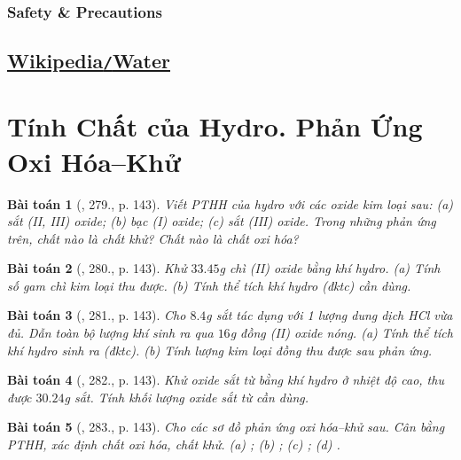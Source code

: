 \documentclass{article}
\newtheorem{baitoan}{Bài toán}
\begin{document}
\subsubsection{Safety \& Precautions}


\subsection{\href{https://en.wikipedia.org/wiki/Water}{Wikipedia\texttt{/}Water}}


\section{Tính Chất của Hydro. Phản Ứng Oxi Hóa--Khử}

\begin{baitoan}[\cite{An_400_BT_Hoa_Hoc_8_2020}, 279., p. 143]
	Viết PTHH của hydro với các oxide kim loại sau: (a) sắt (II, III) oxide; (b) bạc (I) oxide; (c) sắt (III) oxide. Trong những phản ứng trên, chất nào là chất khử? Chất nào là chất oxi hóa?
\end{baitoan}

\begin{baitoan}[\cite{An_400_BT_Hoa_Hoc_8_2020}, 280., p. 143]
	Khử $33.45$\emph{g} chì (II) oxide bằng khí hydro. (a) Tính số gam chì kim loại thu được. (b) Tính thể tích khí hydro (đktc) cần dùng.
\end{baitoan}

\begin{baitoan}[\cite{An_400_BT_Hoa_Hoc_8_2020}, 281., p. 143]
	Cho $8.4$\emph{g} sắt tác dụng với 1 lượng dung dịch \emph{HCl} vừa đủ. Dẫn toàn bộ lượng khí sinh ra qua $16$\emph{g} đồng (II) oxide nóng. (a) Tính thể tích khí hydro sinh ra (đktc). (b) Tính lượng kim loại đồng thu được sau phản ứng.
\end{baitoan}

\begin{baitoan}[\cite{An_400_BT_Hoa_Hoc_8_2020}, 282., p. 143]
	Khử oxide sắt từ bằng khí hydro ở nhiệt độ cao, thu được $30.24$\emph{g} sắt. Tính khối lượng oxide sắt từ cần dùng.
\end{baitoan}

\begin{baitoan}[\cite{An_400_BT_Hoa_Hoc_8_2020}, 283., p. 143]
	Cho các sơ đồ phản ứng oxi hóa--khử sau. Cân bằng PTHH, xác định chất oxi hóa, chất khử. (a) \emph{}; (b) \emph{}; (c) \emph{}; (d) \emph{}.
\end{baitoan}
\end{document}
